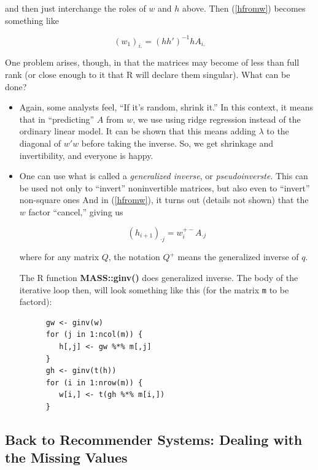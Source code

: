and then just interchange the roles of $w$ and $h$ above.  
Then (\ref{hfromw}) becomes something like

\begin{equation}
(w_1)_{i.} = (hh')^{-1} h A_{i.}
\end{equation}

One problem arises, though, in that the matrices may become of  
less than full rank (or close enough to it that R will declare them
singular).  What can be done?

\begin{itemize}

\item Again, some analysts feel, ``If it's random, shrink it.''  In this
context, it means that in ``predicting'' $A$ from $w$, we use 
using ridge regression instead of the ordinary linear model.  It can be
shown that this means adding $\lambda$ to the diagonal of $w'w$ before
taking the inverse.  So, we get shrinkage and invertibility, and
everyone is happy.

\item One can use what is called a \textit{generalized inverse}, or
\textit{pseudoinverste}.  This can be used not only to ``invert''
noninvertible matrices, but also even to ``invert'' non-square ones  And
in (\ref{hfromw}), it turns out (details not shown) that the $w$ factor
``cancel,'' giving us

\begin{equation}
(h_{i+1})_{\cdot j} = w_i^{+-} A_{\cdot j}
\end{equation}

where for any matrix $Q$, the notation $Q^{+}$ means the generalized
inverse of $q$.

The R function \textbf{MASS::ginv()} does generalized inverse.  The
body of the iterative loop then, will look something like this (for the
matrix \lstinline{m} to be factord):

\begin{lstlisting}
      gw <- ginv(w)
      for (j in 1:ncol(m)) {
         h[,j] <- gw %*% m[,j]
      }
      gh <- ginv(t(h))
      for (i in 1:nrow(m)) {
         w[i,] <- t(gh %*% m[i,])
      }
\end{lstlisting}

\end{itemize} 

\subsection{Back to Recommender Systems:  Dealing with the Missing Values}

